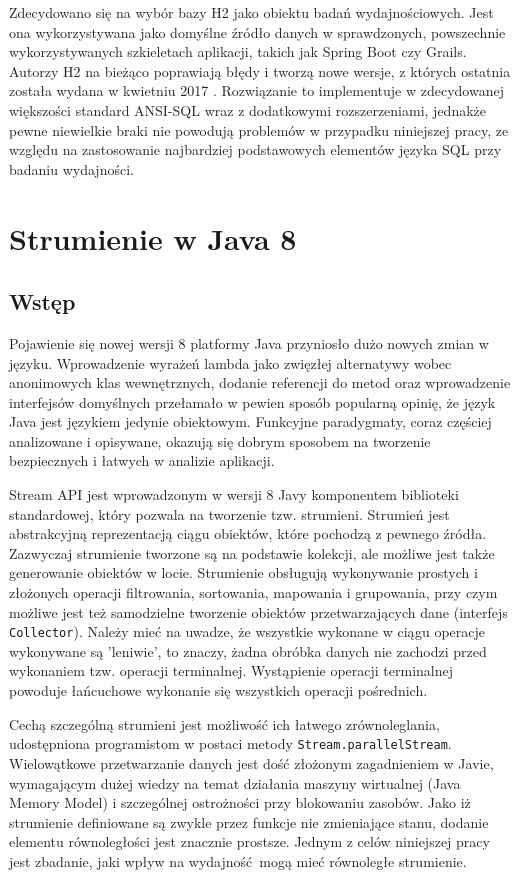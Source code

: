 \documentclass[12pt]{extarticle}
\begin{document}
    Zdecydowano się na wybór bazy H2 jako obiektu badań wydajnościowych. Jest ona wykorzystywana jako domyślne źródło danych w sprawdzonych, powszechnie wykorzystywanych szkieletach aplikacji, takich jak Spring Boot czy Grails. Autorzy H2 na bieżąco poprawiają błędy i tworzą nowe wersje, z których ostatnia została wydana w kwietniu 2017 \cite{h2maven}. Rozwiązanie to implementuje w zdecydowanej większości standard ANSI-SQL wraz z dodatkowymi rozszerzeniami, jednakże pewne niewielkie braki nie powodują problemów w przypadku niniejszej pracy, ze względu na zastosowanie najbardziej podstawowych elementów języka SQL przy badaniu wydajności.

\section{Strumienie w Java 8}

\subsection{Wstęp}

    Pojawienie się nowej wersji 8 platformy Java przyniosło dużo nowych zmian w języku. Wprowadzenie wyrażeń lambda jako zwięzłej alternatywy wobec anonimowych klas wewnętrznych, dodanie referencji do metod oraz wprowadzenie interfejsów domyślnych przełamało w pewien sposób popularną opinię, że język Java jest językiem jedynie obiektowym. Funkcyjne paradygmaty, coraz częściej analizowane i opisywane, okazują się dobrym sposobem na tworzenie bezpiecznych i łatwych w analizie aplikacji.

    Stream API jest wprowadzonym w wersji 8 Javy komponentem biblioteki standardowej, który pozwala na tworzenie tzw. strumieni. Strumień jest abstrakcyjną reprezentacją ciągu obiektów, które pochodzą z pewnego źródła. Zazwyczaj strumienie tworzone są na podstawie kolekcji, ale możliwe jest także generowanie obiektów w locie. Strumienie obsługują wykonywanie prostych i złożonych operacji filtrowania, sortowania, mapowania i grupowania, przy czym możliwe jest też samodzielne tworzenie obiektów przetwarzających dane (interfejs \texttt{Collector}). Należy mieć na uwadze, że wszystkie wykonane w ciągu operacje wykonywane są 'leniwie', to znaczy, żadna obróbka danych nie zachodzi przed wykonaniem tzw. operacji terminalnej. Wystąpienie operacji terminalnej powoduje łańcuchowe wykonanie się wszystkich operacji pośrednich.

    Cechą szczególną strumieni jest możliwość ich łatwego zrównoleglania, udostępniona programistom w postaci metody \texttt{Stream.parallelStream}. Wielowątkowe przetwarzanie danych jest dość złożonym zagadnieniem w Javie, wymagającym dużej wiedzy na temat działania maszyny wirtualnej (Java Memory Model) i szczególnej ostrożności przy blokowaniu zasobów. Jako iż strumienie definiowane są zwykle przez funkcje nie zmieniające stanu, dodanie elementu równoległości jest znacznie prostsze. Jednym z celów niniejszej pracy jest zbadanie, jaki wpływ na wydajność mogą mieć równoległe strumienie.
\end{document}
